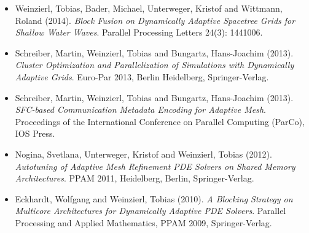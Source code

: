 \begin{itemize}
  \item Weinzierl, Tobias, Bader, Michael, Unterweger, Kristof and Wittmann,
  Roland (2014). {\em Block Fusion on Dynamically Adaptive Spacetree Grids for
  Shallow Water Waves}. Parallel Processing Letters 24(3): 1441006.
  \item Schreiber, Martin, Weinzierl, Tobias and Bungartz, Hans-Joachim (2013).
  {\em Cluster Optimization and Parallelization of Simulations with Dynamically
  Adaptive Grids}. Euro-Par 2013, Berlin Heidelberg, Springer-Verlag.
  \item Schreiber, Martin, Weinzierl, Tobias and Bungartz, Hans-Joachim (2013).
  {\em SFC-based Communication Metadata Encoding for Adaptive Mesh}. Proceedings
  of the International Conference on Parallel Computing (ParCo), IOS Press.
  \item Nogina, Svetlana, Unterweger, Kristof and Weinzierl, Tobias (2012).
  {\em Autotuning of Adaptive Mesh Refinement PDE Solvers on Shared Memory
  Architectures}. PPAM 2011, Heidelberg, Berlin, Springer-Verlag.
  \item Eckhardt, Wolfgang and Weinzierl, Tobias (2010). {\em A Blocking
  Strategy on Multicore Architectures for Dynamically Adaptive PDE Solvers}.
  Parallel Processing and Applied Mathematics, PPAM 2009, Springer-Verlag.
\end{itemize}
